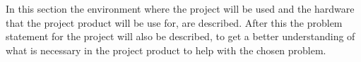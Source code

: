 In this section the environment where the project will be used and the hardware that the project product will be use for, are described. After this the problem statement for the project will also be described, to get a better understanding of what is necessary in the project product to help with the chosen problem.